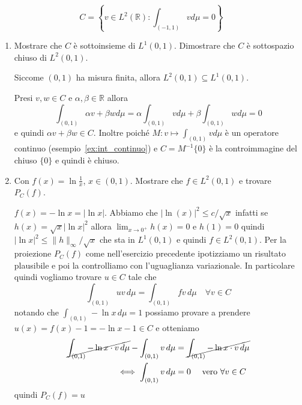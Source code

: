 \begin{eser}
    \[
      C = \left\{v \in L^2{(\mathbb{R})} : \int_{(-1, 1)} v d\mu = 0\right\} 
    \]
\begin{enumerate}[label = \alph*)]
    \item Mostrare che \(C\) è sottoinsieme di \(L^{1}{(0, 1)}\). Dimostrare che
        \(C\) è sottospazio chiuso di \(L^2{(0, 1)}\). 

        Siccome \((0, 1)\) ha misura finita, allora \(L^2{(0, 1)} \subseteq
        L^1{(0, 1)}\). 

        Presi \(v, w \in C\) e \(\alpha, \beta \in \mathbb{R}\) allora
        \[
            \int_{(0,1)} \alpha v + \beta w d\mu = \alpha \int_{(0,1)} v d\mu +
            \beta \int_{(0,1)} w d\mu = 0
        \]
        e quindi \(\alpha v + \beta w \in C\). Inoltre poiché \(M : v \mapsto
        \int_{(0, 1)} v d\mu \) è un operatore continuo
        (esempio~\ref{ex:int_continuo}) e \(C = M^{-1}{\{0\}}\) è la
        controimmagine del chiuso \(\{0\}\) e quindi è chiuso.

    \item Con \(f{(x)} = \ln \frac{1}{x}\), \(x \in (0, 1)\). Mostrare
        che \(f \in L^{2}{(0, 1)}\) e trovare \(P_C{(f)}\). 

        \(f{(x)} = -\ln x = |\ln x|\). Abbiamo che \(\left| \ln {(x)} \right| ^2
        \le c / \sqrt{x}\) infatti se \(h{(x)} = \sqrt{x} \left| \ln x
        \right|^2\) allora \(\lim_{x \to 0^{+}} h{(x)} = 0\) e \(h{(1)} = 0\)
        quindi \(\left| \ln x \right| ^2 \le \|h\|_{\infty}  / \sqrt{x}\) che
        sta in \(L^{1}{(0, 1)}\) e quindi \(f \in L^{2}{(0, 1)}\). Per la
        proiezione \(P_C{(f)}\) come nell'esercizio precedente ipotizziamo un
        risultato plausibile e poi la controlliamo con l'uguaglianza
        variazionale. In particolare quindi vogliamo trovare \(u \in C\) tale
        che
        \[
            \int_{(0, 1)} uv \, d\mu = \int_{(0,1)} fv\,d\mu  \quad \forall v \in C
        \]
        notando che \(\int _{(0,1)} -\ln x \,d \mu = 1\) possiamo provare a
        prendere \(u{(x)} = f{(x)} - 1 = -\ln x - 1 \in C\) e otteniamo
        \begin{align*}
            \cancel{\int _{(0,1)} -\ln x \cdot v \,d \mu} - \int _{(0, 1)} v \,d
            \mu &= \cancel{\int_{(0,1)} -\ln x \cdot v \,d \mu}  \\
            \iff \int_{{(0,1)}} v \,d \mu &= 0 \quad \text{ vero } \forall v \in C
        \end{align*}
        quindi \(P_C{(f)} = u\)
\end{enumerate}
\end{eser}

